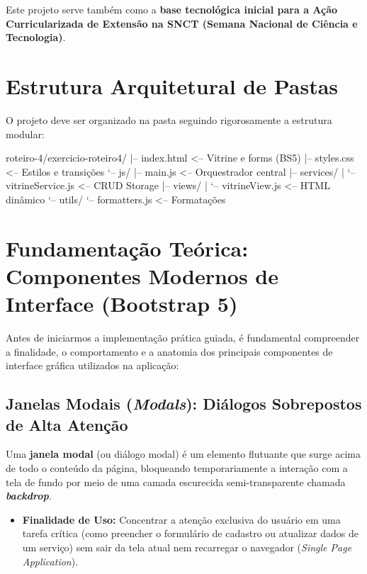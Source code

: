 Este projeto serve também como a \textbf{base tecnológica inicial para a Ação Curricularizada de Extensão na SNCT (Semana Nacional de Ciência e Tecnologia)}.


\section{Estrutura Arquitetural de Pastas}\label{sec:m1a}

O projeto deve ser organizado na pasta  seguindo rigorosamente a estrutura modular:

\begin{arvore}
roteiro-4/exercicio-roteiro4/
|-- index.html     <-- Vitrine e forms (BS5)
|-- styles.css     <-- Estilos e transições
`-- js/
    |-- main.js    <-- Orquestrador central
    |-- services/
    |   `-- vitrineService.js <-- CRUD Storage
    |-- views/
    |   `-- vitrineView.js    <-- HTML dinâmico
    `-- utils/
        `-- formatters.js     <-- Formatações
\end{arvore}


\section{Fundamentação Teórica: Componentes Modernos de Interface (Bootstrap 5)}\label{sec:m1b}

Antes de iniciarmos a implementação prática guiada, é fundamental compreender a finalidade, o comportamento e a anatomia dos principais componentes de interface gráfica utilizados na aplicação:

\subsection{Janelas Modais (\textit{Modals}): Diálogos Sobrepostos de Alta Atenção}
Uma \textbf{janela modal} (ou diálogo modal) é um elemento flutuante que surge acima de todo o conteúdo da página, bloqueando temporariamente a interação com a tela de fundo por meio de uma camada escurecida semi-transparente chamada \textbf{\textit{backdrop}}.
\begin{itemize}
  \item \textbf{Finalidade de Uso:} Concentrar a atenção exclusiva do usuário em uma tarefa crítica (como preencher o formulário de cadastro ou atualizar dados de um serviço) sem sair da tela atual nem recarregar o navegador (\textit{Single Page Application}).
\end{itemize}

